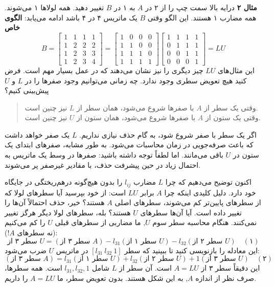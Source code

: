 \documentclass[12pt, a4paper]{book}
\begin{document}
	\textbf{مثال ۲} درایه بالا سمت چپ را از ۲ در $A$ به ۱ در $B$ تغییر دهید. همه لولاها ۱ می‌شوند. همه مضارب ۱ هستند. این الگو وقتی $B$ یک ماتریس ۴ در ۴ باشد ادامه می‌یابد:
	\textbf{الگوی خاص}
	\[ B = \begin{bmatrix} 1 & 1 & 1 & 1 \\ 1 & 2 & 2 & 2 \\ 1 & 2 & 3 & 3 \\ 1 & 2 & 3 & 4 \end{bmatrix} = \begin{bmatrix} 1 & 0 & 0 & 0 \\ 1 & 1 & 0 & 0 \\ 1 & 1 & 1 & 0 \\ 1 & 1 & 1 & 1 \end{bmatrix} \begin{bmatrix} 1 & 1 & 1 & 1 \\ 0 & 1 & 1 & 1 \\ 0 & 0 & 1 & 1 \\ 0 & 0 & 0 & 1 \end{bmatrix} = LU \]
	این مثال‌های $LU$ چیز دیگری را نیز نشان می‌دهند که در عمل بسیار مهم است. فرض کنید هیچ تعویض سطری وجود ندارد. چه زمانی می‌توانیم وجود صفرها را در $L$ و $U$ پیش‌بینی کنیم؟
	\begin{quote}
		وقتی یک سطر از $A$ با صفرها شروع می‌شود، همان سطر از $L$ نیز چنین است. \\
		وقتی یک ستون از $A$ با صفرها شروع می‌شود، همان ستون از $U$ نیز چنین است.
	\end{quote}
	اگر یک سطر با صفر شروع شود، به گام حذف نیازی نداریم. $L$ یک صفر خواهد داشت که باعث صرفه‌جویی در زمان محاسبات می‌شود. به طور مشابه، صفرهای ابتدای یک ستون در $U$ باقی می‌مانند. اما لطفاً توجه داشته باشید: صفرها در وسط یک ماتریس به احتمال زیاد در حین پیشرفت حذف، با مقادیر غیرصفر پر می‌شوند.
	
	اکنون توضیح می‌دهیم که چرا $L$ مضارب $l_{ij}$ را بدون هیچ‌گونه درهم‌ریختگی در جایگاه خود دارد.
	دلیل کلیدی اینکه چرا $A$ برابر $LU$ است: از خود بپرسید آیا سطرهای لولا که از سطرهای پایین‌تر کم می‌شوند، سطرهای اصلی $A$ هستند؟ خیر، حذف احتمالاً آن‌ها را تغییر داده است. آیا آن‌ها سطرهای $U$ هستند؟ بله، سطرهای لولا دیگر هرگز تغییر نمی‌کنند. هنگام محاسبه سطر سوم $U$, ما مضاربی از سطرهای قبلی $U$ را کم می‌کنیم (نه سطرهای $A$!):
	\[ \text{سطر ۳ از } U = (\text{سطر ۳ از } A) - l_{31}(\text{سطر ۱ از } U) - l_{32}(\text{سطر ۲ از } U) \quad (۱) \]
	این معادله را بازنویسی کنید تا ببینید که سطر $[ l_{31} \ l_{32} \ 1 ]$ در ماتریس $U$ ضرب می‌شود:
	\[ (\text{سطر ۳ از } A) = l_{31}(\text{سطر ۱ از } U) + l_{32}(\text{سطر ۲ از } U) + 1(\text{سطر ۳ از } U) \quad (۲) \]
	این دقیقاً سطر ۳ از $A = LU$ است. آن سطر از $L$ شامل $l_{31}, l_{32}, 1$ است. همه سطرها، صرف نظر از اندازه $A$, به این شکل هستند. بدون تعویض سطر، ما $A=LU$ را داریم.
	
\end{document}

